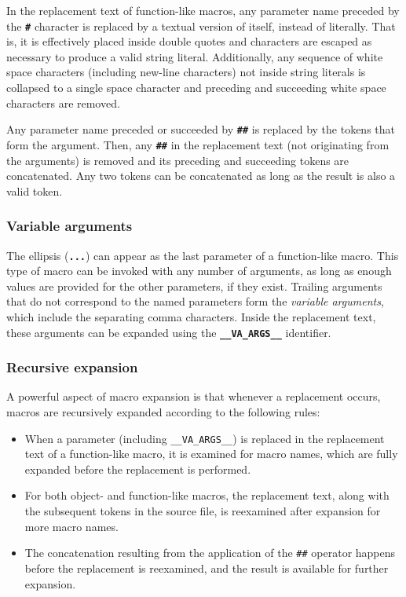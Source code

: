 In the replacement text of function-like macros, any parameter name preceded by
the \textbf{\texttt{\#}} character is replaced by a textual version of itself,
instead of literally.  That is, it is effectively placed inside double quotes
and characters are escaped as necessary to produce a valid string literal.
Additionally, any sequence of white space characters (including new-line
characters) not inside string literals is collapsed to a single space character
and preceding and succeeding white space characters are removed.

Any parameter name preceded or succeeded by \textbf{\texttt{\#\#}} is replaced
by the tokens that form the argument.  Then, any \textbf{\texttt{\#\#}} in the
replacement text (not originating from the arguments) is removed and its
preceding and succeeding tokens are concatenated.  Any two tokens can be
concatenated as long as the result is also a valid token.

\subsubsection{Variable arguments}

The ellipsis (\textbf{\texttt{...}}) can appear as the last parameter of a
function-like macro.  This type of macro can be invoked with any number of
arguments, as long as enough values are provided for the other parameters, if
they exist.  Trailing arguments that do not correspond to the named parameters
form the \textit{variable arguments}, which include the separating comma
characters.  Inside the replacement text, these arguments can be expanded using
the \textbf{\texttt{\_\_VA\_ARGS\_\_}} identifier.

\subsubsection{Recursive expansion}

A powerful aspect of macro expansion is that whenever a replacement occurs,
macros are recursively expanded according to the following rules:

\begin{itemize}
    \item
        When a parameter (including \texttt{\_\_VA\_ARGS\_\_}) is replaced in
        the replacement text of a function-like macro, it is examined for macro
        names, which are fully expanded before the replacement is performed.
    \item
        For both object- and function-like macros, the replacement text, along
        with the subsequent tokens in the source file, is reexamined after
        expansion for more macro names.
    \item
        The concatenation resulting from the application of the \texttt{\#\#}
        operator happens before the replacement is reexamined, and the result is
        available for further expansion.
\end{itemize}


